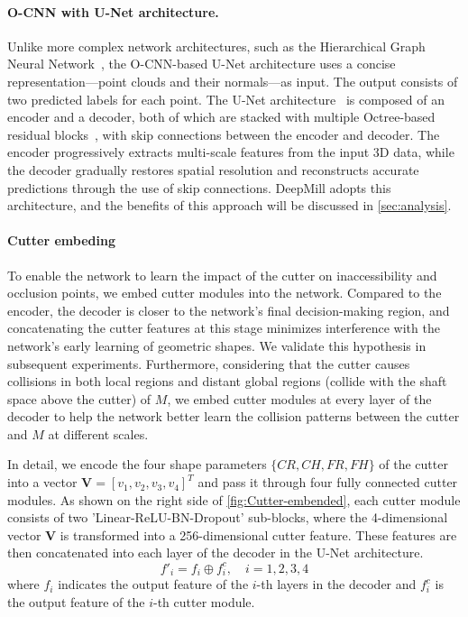 \paragraph{O-CNN with U-Net architecture.}
Unlike more complex network architectures, such as the Hierarchical Graph Neural Network~\cite{huang5065158hierarchical}, the O-CNN-based U-Net architecture uses a concise representation—point clouds and their normals—as input. The output consists of two predicted labels for each point. 
The U-Net architecture~\cite{ronneberger2015u} is composed of an encoder and a decoder, both of which are stacked with multiple Octree-based residual blocks~\cite{wang2017cnn}, with skip connections between the encoder and decoder. 
The encoder progressively extracts multi-scale features from the input 3D data, while the decoder gradually restores spatial resolution and reconstructs accurate predictions through the use of skip connections. 
DeepMill adopts this architecture, and the benefits of this approach will be discussed in \autoref{sec:analysis}.

 
\paragraph{Cutter embeding}
To enable the network to learn the impact of the cutter on inaccessibility and occlusion points, we embed cutter modules into the network. Compared to the encoder, the decoder is closer to the network's final decision-making region, and concatenating the cutter features at this stage minimizes interference with the network's early learning of geometric shapes. We validate this hypothesis in subsequent experiments. Furthermore, considering that the cutter causes collisions in both local regions and distant global regions (collide with the shaft space above the cutter) of $M$, we embed cutter modules at every layer of the decoder to help the network better learn the collision patterns between the cutter and $M$ at different scales.

In detail, we encode the four shape parameters $\{CR, CH, FR, FH\}$ of the cutter into a vector $\mathbf{V} = [v_1, v_2, v_3, v_4]^T$ and pass it through four fully connected cutter modules. As shown on the right side of \autoref{fig:Cutter-embended}, each cutter module consists of two 'Linear-ReLU-BN-Dropout' sub-blocks, where the 4-dimensional vector $\mathbf{V}$ is transformed into a 256-dimensional cutter feature. These features are then concatenated into each layer of the decoder in the U-Net architecture.
\begin{equation} 
f'_i = f_i \oplus f_i^c, \quad i = 1, 2, 3, 4
\end{equation}
where $f_i$ indicates the output feature of the $i$-th layers in the decoder and $f_i^c$ is the output feature of the $i$-th cutter module. 



